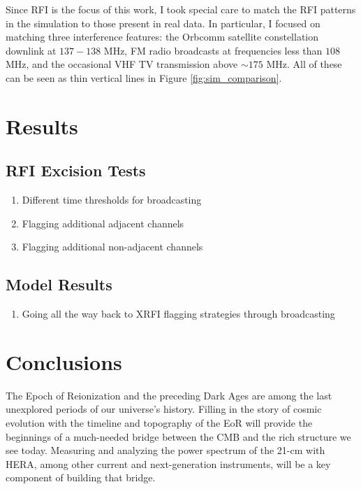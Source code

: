 \documentclass[12pt]{article}
\begin{document}
Since RFI is the focus of this work, I took special care to  match the RFI patterns in the simulation to those present in real data. In particular, I focused on matching three interference features: the Orbcomm satellite constellation downlink at $137 - 138$ MHz, FM radio broadcasts at frequencies less than $108$ MHz, and the occasional VHF TV transmission above $\sim 175$ MHz. All of these can be seen as thin vertical lines in Figure \ref{fig:sim_comparison}.

\section{Results}

\subsection{RFI Excision Tests} \label{subsec:rfi_tests}

\begin{enumerate}
	\item Different time thresholds for broadcasting
	\item Flagging additional adjacent channels
	\item Flagging additional non-adjacent channels
\end{enumerate}

\subsection{Model Results} \label{subsec:model_results}

\begin{enumerate}
	\item Going all the way back to XRFI flagging strategies through broadcasting
\end{enumerate}

\section{Conclusions}

The Epoch of Reionization and the preceding Dark Ages are among the last unexplored periods of our universe's history. Filling in the story of cosmic evolution with the timeline and topography of the EoR will provide the beginnings of a much-needed bridge between the CMB and the rich structure we see today. Measuring and analyzing the power spectrum of the 21-cm with HERA, among other current and next-generation instruments, will be a key component of building that bridge.
\end{document}
